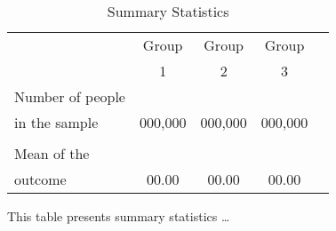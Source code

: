 \begin{table}[H]
    \begin{center}
    \caption{Summary Statistics}
    \begin{tabular}{lcccc} 
    \toprule
    & Group & Group & Group \\
    & 1 & 2 & 3 \\
    \midrule
    Number of people \\
    in the sample & 000,000 & 000,000 & 000,000  \\
    \\
    Mean of the \\
    outcome & 00.00 & 00.00 & 00.00 \\
    \bottomrule
    \end{tabular}
    \label{tab:summary_statistics}
    \end{center}
    
	\begin{minipage}{0.90\textwidth} 
	{\footnotesize 
    This table presents summary statistics \ldots
	\par}
	\end{minipage}
\end{table}
